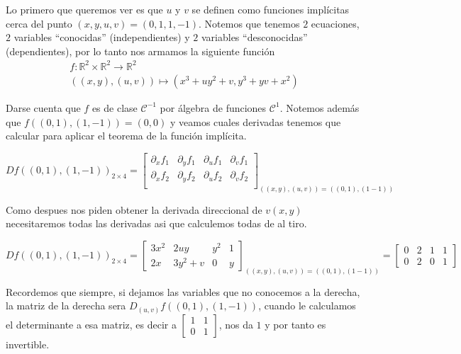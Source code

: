 \documentclass[a4paper,oneside,10.5pt]{article}
\newcommand\RR{\mathbb{R}}
\theoremstyle{definition}
\theoremstyle{plain}
\theoremstyle{remark}
\theoremstyle{theorem}
\begin{document}
\sol Lo primero que queremos ver es que $u$ y $v$ se definen como funciones implícitas cerca del punto $(x, y, u, v) = (0, 1, 1, -1)$. Notemos que tenemos $2$ ecuaciones, $2$ variables ``conocidas'' (independientes) y $2$ variables ``desconocidas'' (dependientes), por lo tanto nos armamos la siguiente función
\begin{gather*}
    f : \RR^2 \times \RR^2 \to \RR^2\\
    ((x, y), (u, v)) \mapsto (x^3 + uy^2 + v, y^3 + yv + x^2)
\end{gather*}

Darse cuenta que $f$ es de clase $\mathcal{C}^{-1}$ por álgebra de funciones $\mathcal{C}^1$. Notemos además que $f((0, 1), (1, -1)) = (0, 0)$ y veamos cuales derivadas tenemos que calcular para aplicar el teorema de la función implícita.

\begin{equation*}
    Df((0,1), (1, -1))_{2 \times 4} = \left[\begin{array}{cc|cc}
        \partial_x f_1 & \partial_y f_1 & \partial_u f_1 & \partial_v f_1\\
        \partial_x f_2 & \partial_y f_2 & \partial_u f_2 & \partial_v f_2\\
    \end{array}
    \right]_{((x, y), (u, v)) = ((0, 1), (1 -1))}
\end{equation*}

Como despues nos piden obtener la derivada direccional de $v(x, y)$ necesitaremos todas las derivadas asi que calculemos todas de al tiro.

\begin{equation}
    Df((0,1), (1, -1))_{2 \times 4} = \left[\begin{array}{cc|cc}
        3x^2 & 2uy & y^2 & 1\\
        2x & 3y^2 + v & 0 & y
    \end{array}
    \right]_{((x, y), (u, v)) = ((0, 1), (1 -1))} = \left[\begin{array}{cc|cc}
        0 & 2 & 1 & 1\\
        0 & 2 & 0 & 1
    \end{array}
    \right]
\end{equation}

Recordemos que siempre, si dejamos las variables que no conocemos a la derecha, la matriz de la derecha sera $D_{(u, v)}f((0, 1), (1, -1))$, cuando le calculamos el determinante a esa matriz, es decir a $\begin{bmatrix}1 & 1\\ 0 & 1\end{bmatrix}$, nos da $1$ y por tanto es invertible.
\end{document}
